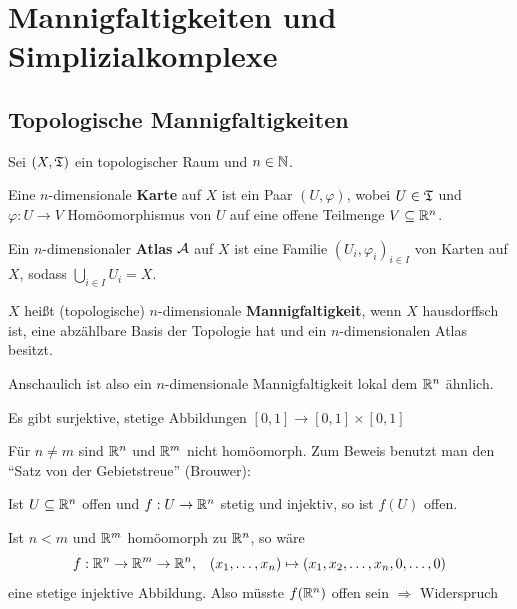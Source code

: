 \chapter{Mannigfaltigkeiten und Simplizialkomplexe}
\section{Topologische Mannigfaltigkeiten}
\begin{definition}%
    Sei $(X, \mathfrak{T})$ ein topologischer Raum und $n \in \mathbb{N}$.
    \begin{defenum}
        \item Eine $n$-dimensionale \textbf{Karte} auf
              $X$ ist ein Paar $(U, \varphi)$, wobei $U \in \mathfrak{T}$
              und $\varphi: U \rightarrow V$ Homöomorphismus
              von $U$ auf eine offene Teilmenge $V \subseteq \mathbb{R}^n$.
        \item Ein $n$-dimensionaler \textbf{Atlas} $\mathcal{A}$ auf $X$ ist eine
              Familie $(U_i, \varphi_i)_{i \in I}$ von Karten auf $X$,
              sodass $\bigcup_{i \in I} U_i = X$.
        \item $X$ heißt (topologische) $n$-dimensionale \textbf{Mannigfaltigkeit},
              wenn $X$ hausdorffsch ist, eine abzählbare Basis der 
              Topologie hat und ein $n$-dimensionalen Atlas besitzt.
    \end{defenum}
\end{definition}

Anschaulich ist also ein $n$-dimensionale Mannigfaltigkeit lokal dem $\mathbb{R}^n$ ähnlich.

\begin{bemerkung}
    \begin{bemenum}
        \item Es gibt surjektive, stetige Abbildungen $[0,1] \rightarrow [0,1] \times [0,1]$
        \item Für $n \neq m$ sind $\mathbb{R}^n$ und $\mathbb{R}^m$ nicht homöomorph.
              Zum Beweis benutzt man den \enquote{Satz von der Gebietstreue} (Brouwer):

              Ist $U \subseteq \mathbb{R}^n$ offen und $f: U \rightarrow \mathbb{R}^n$
              stetig und injektiv, so ist $f(U)$ offen.

              Ist $n < m$ und $\mathbb{R}^m$ homöomorph zu $\mathbb{R}^n$, so wäre
              \[f:\mathbb{R}^n \rightarrow \mathbb{R}^m \rightarrow \mathbb{R}^n, \;\;\; (x_1, \dots, x_n) \mapsto (x_1, x_2, \dots, x_n, 0, \dots, 0)\]
              eine stetige injektive Abbildung. Also müsste $f(\mathbb{R}^n)$
              offen sein $\Rightarrow$ Widerspruch
    \end{bemenum}
\end{bemerkung}

